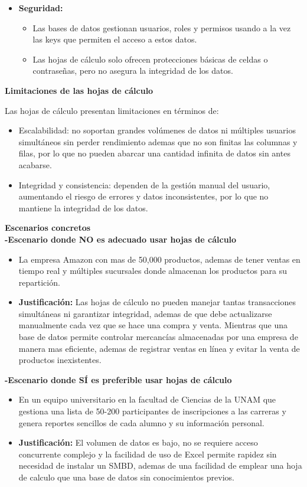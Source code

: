 \documentclass[12pt]{report}
\begin{document}
\begin{enumerate}[label=\textbf{\arabic*.}, leftmargin=*]
\begin{enumerate}[label=\textbf{\alph*.}, leftmargin=*, itemsep=1.0em]
\begin{itemize}
    \item \textbf{Seguridad:}
    \begin{itemize}
        \item Las bases de datos gestionan usuarios, roles y permisos usando a la vez las keys que permiten el acceso a estos datos.
        \item Las hojas de cálculo solo ofrecen protecciones básicas de celdas o contraseñas, pero no asegura la integridad de los datos.
    \end{itemize}
\end{itemize}

\textbf{Limitaciones de las hojas de cálculo}
 
Las hojas de cálculo presentan limitaciones en términos de:
\begin{itemize}
    \item Escalabilidad: no soportan grandes volúmenes de datos ni múltiples usuarios simultáneos sin perder rendimiento ademas que no son finitas las columnas y filas, por lo que no pueden abarcar una cantidad infinita de datos sin antes acabarse.
    \item Integridad y consistencia: dependen de la gestión manual del usuario, aumentando el riesgo de errores y datos inconsistentes, por lo que no mantiene la integridad de los datos.
\end{itemize}
\newpage
\textbf{Escenarios concretos}\\
\textbf{-Escenario donde NO es adecuado usar hojas de cálculo}
\begin{itemize}
    \item La empresa Amazon con mas de 50,000 productos, ademas de tener ventas en tiempo real y múltiples sucursales donde almacenan los productos para su repartición.
    \item \textbf{Justificación:} Las hojas de cálculo no pueden manejar tantas transacciones simultáneas ni garantizar integridad, ademas de que debe actualizarse manualmente cada vez que se hace una compra y venta. Mientras que una base de datos permite controlar mercancías almacenadas por una empresa de manera mas eficiente, ademas de registrar ventas en línea y evitar la venta de productos inexistentes.
\end{itemize}

\textbf{-Escenario donde SÍ es preferible usar hojas de cálculo}
\begin{itemize}
    \item En un equipo universitario en la facultad de Ciencias de la UNAM que gestiona una lista de 50-200 participantes de inscripciones a las carreras y genera reportes sencillos de cada alumno y su información personal.
    \item \textbf{Justificación:} El volumen de datos es bajo, no se requiere acceso concurrente complejo y la facilidad de uso de Excel permite rapidez sin necesidad de instalar un SMBD, ademas de una facilidad de emplear una hoja de calculo que una base de datos sin conocimientos previos.
\end{itemize}


\end{enumerate}
\end{enumerate}
\end{document}
